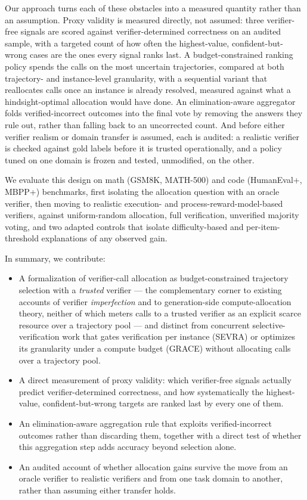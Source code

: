 \documentclass[11pt]{article}
\begin{document}
Our approach turns each of these obstacles into a measured quantity rather than an assumption. Proxy validity is measured directly, not assumed: three verifier-free signals are scored against verifier-determined correctness on an audited sample, with a targeted count of how often the highest-value, confident-but-wrong cases are the ones every signal ranks last. A budget-constrained ranking policy spends the calls on the most uncertain trajectories, compared at both trajectory- and instance-level granularity, with a sequential variant that reallocates calls once an instance is already resolved, measured against what a hindsight-optimal allocation would have done. An elimination-aware aggregator folds verified-incorrect outcomes into the final vote by removing the answers they rule out, rather than falling back to an uncorrected count. And before either verifier realism or domain transfer is assumed, each is audited: a realistic verifier is checked against gold labels before it is trusted operationally, and a policy tuned on one domain is frozen and tested, unmodified, on the other.

We evaluate this design on math (GSM8K, MATH-500) and code (HumanEval+, MBPP+) benchmarks, first isolating the allocation question with an oracle verifier, then moving to realistic execution- and process-reward-model-based verifiers, against uniform-random allocation, full verification, unverified majority voting, and two adapted controls that isolate difficulty-based and per-item-threshold explanations of any observed gain.

In summary, we contribute:
\begin{itemize}[leftmargin=1.4em]
\item A formalization of verifier-call allocation as budget-constrained trajectory selection with a \emph{trusted} verifier --- the complementary corner to existing accounts of verifier \emph{imperfection} and to generation-side compute-allocation theory, neither of which meters calls to a trusted verifier as an explicit scarce resource over a trajectory pool --- and distinct from concurrent selective-verification work that gates verification per instance (SEVRA) or optimizes its granularity under a compute budget (GRACE) without allocating calls over a trajectory pool.
\item A direct measurement of proxy validity: which verifier-free signals actually predict verifier-determined correctness, and how systematically the highest-value, confident-but-wrong targets are ranked last by every one of them.
\item An elimination-aware aggregation rule that exploits verified-incorrect outcomes rather than discarding them, together with a direct test of whether this aggregation step adds accuracy beyond selection alone.
\item An audited account of whether allocation gains survive the move from an oracle verifier to realistic verifiers and from one task domain to another, rather than assuming either transfer holds.
\end{itemize}
\end{document}
